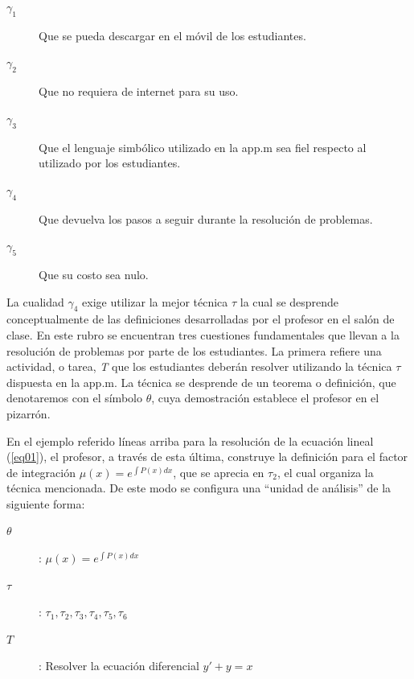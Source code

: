 \documentclass[spanish]{textolivre}
\begin{document}
\begin{description}
\item[$\gamma_1$] Que se pueda descargar en el móvil de los estudiantes.
\item[$\gamma_2$] Que no requiera de internet para su uso.
\item[$\gamma_3$] Que el lenguaje simbólico utilizado en la app.m sea fiel respecto al utilizado por
los estudiantes.
\item[$\gamma_4$] Que devuelva los pasos a seguir durante la resolución de problemas.
\item[$\gamma_5$] Que su costo sea nulo.
\end{description}

La cualidad $\gamma_4$ exige utilizar la mejor técnica $\tau$ la cual se desprende conceptualmente de las definiciones desarrolladas por el profesor en el salón de clase. En este rubro se encuentran tres cuestiones fundamentales que llevan a la resolución de problemas por parte de los estudiantes. La primera refiere una actividad, o tarea, \emph{T} que los estudiantes deberán resolver utilizando la técnica $\tau$ dispuesta en la app.m. La técnica se desprende de un teorema o definición, que denotaremos con el símbolo $\theta$, cuya demostración establece el profesor en el pizarrón. 

En el ejemplo referido líneas arriba para la resolución de la ecuación lineal (\ref{eq01}), el profesor, a través de esta última, construye la definición para el factor de integración $\mu(x) = e^{\int P(x)d x}$, que se aprecia en $\tau_2$, el cual organiza la técnica mencionada. De este modo se configura una “unidad de análisis” de la siguiente forma:


\begin{description}
\item[$\theta$]: $\mu(x) = e^{\int P(x)d x}$
\item[$\tau$]: $\tau_1, \tau_2, \tau_3, \tau_4, \tau_5, \tau_6$
\item[$T$]: Resolver la ecuación diferencial $y'+ y = x$
\end{description}
\end{document}
